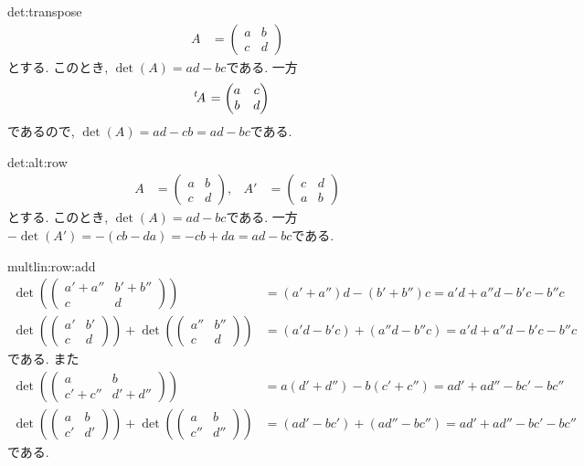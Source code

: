 \begin{proofof}{det:transpose}
  \begin{align*}
    A&=
    \begin{pmatrix}
      a&b\\c&d
    \end{pmatrix}
  \end{align*}
  とする.
  このとき, $\det(A)=ad-bc$である.
  一方
  \begin{align*}
    {\left.^{t}\!A\right.}&=
    \begin{pmatrix}
      a&c\\b&d
    \end{pmatrix}
  \end{align*}
  であるので,
  $\det(A)=ad-cb=ad-bc$である.
\end{proofof}

\begin{proofof}{det:alt:row}
  \begin{align*}
    A&=\begin{pmatrix}a&b\\c&d\end{pmatrix},&
    A'&=\begin{pmatrix}c&d\\a&b\end{pmatrix}
  \end{align*}
  とする.
  このとき, $\det(A)=ad-bc$である.
  一方$-\det(A')=-(cb-da)=-cb+da=ad-bc$である.
\end{proofof}
  
  
\begin{proofof}{multlin:row:add}
      \begin{align*}
        \det(\begin{pmatrix}a'+a''&b'+b''\\c&d\end{pmatrix})
          &=(a'+a'')d-(b'+b'')c=a'd+a''d-b'c-b''c\\
        \det(\begin{pmatrix}a'&b'\\c&d\end{pmatrix})
          +
          \det(\begin{pmatrix}a''&b''\\c&d\end{pmatrix})
            &=(a'd-b'c)+(a''d-b''c)=a'd+a''d-b'c-b''c
      \end{align*}
      である.
      また
      \begin{align*}
        \det(\begin{pmatrix}a&b\\c'+c''&d'+d''\end{pmatrix})&=
          a(d'+d'')-b(c'+c'')=ad'+ad''-bc'-bc''\\
        \det(\begin{pmatrix}a&b\\c'&d'\end{pmatrix})+
          \det(\begin{pmatrix}a&b\\c''&d''\end{pmatrix})
            &=(ad'-bc')+(ad''-bc'')=ad'+ad''-bc'-bc''
      \end{align*}
      である.
\end{proofof}

